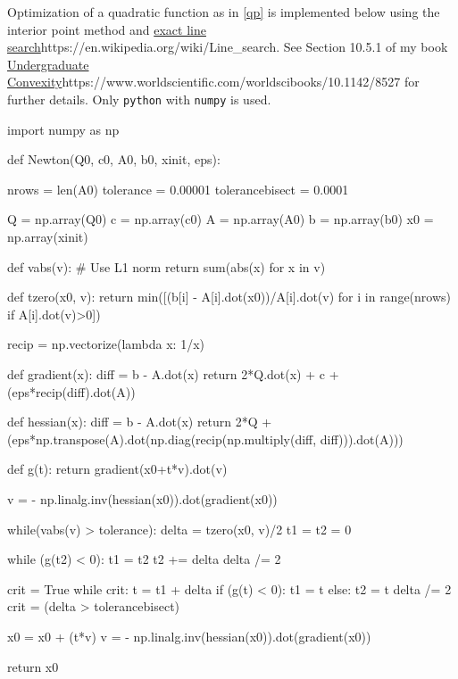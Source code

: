 \documentclass{article}
\begin{document}
Optimization of a quadratic function as in \eqref{qp} is implemented below using the
interior point method and \url{exact line search}{https://en.wikipedia.org/wiki/Line_search}. See Section 10.5.1 of my book \url{Undergraduate Convexity}{https://www.worldscientific.com/worldscibooks/10.1142/8527} for further details. Only
\texttt{python} with \texttt{numpy} is used.

\begin{sage}[python]
import numpy as np

def Newton(Q0, c0, A0, b0, xinit, eps):

    nrows = len(A0)
    tolerance = 0.00001
    tolerancebisect = 0.0001

    
    Q = np.array(Q0)
    c = np.array(c0)
    A = np.array(A0)
    b = np.array(b0)
    x0 = np.array(xinit)

    def vabs(v): # Use L1 norm
      return sum(abs(x) for x in v)
    
    def tzero(x0, v):
        return min([(b[i] - A[i].dot(x0))/A[i].dot(v) for i in range(nrows) if A[i].dot(v)>0])

    recip = np.vectorize(lambda x: 1/x)
    
    def gradient(x):
      diff = b - A.dot(x)
      return 2*Q.dot(x) + c + (eps*recip(diff).dot(A))

    def hessian(x):
      diff = b - A.dot(x)
      return 2*Q + (eps*np.transpose(A).dot(np.diag(recip(np.multiply(diff, diff))).dot(A)))

    def g(t):
      return gradient(x0+t*v).dot(v)
  
    v = - np.linalg.inv(hessian(x0)).dot(gradient(x0))

    while(vabs(v) > tolerance):
        delta = tzero(x0, v)/2
        t1 = t2 = 0
        
        while (g(t2) < 0):
            t1 = t2
            t2 += delta
            delta /= 2

        crit = True
        while crit:
            t = t1 + delta
            if (g(t) < 0):
                t1 = t
            else:
                t2 = t
            delta /= 2
            crit = (delta > tolerancebisect) 
        
        x0 = x0 + (t*v)
        v = - np.linalg.inv(hessian(x0)).dot(gradient(x0))

    return x0


\end{sage}
\end{document}
